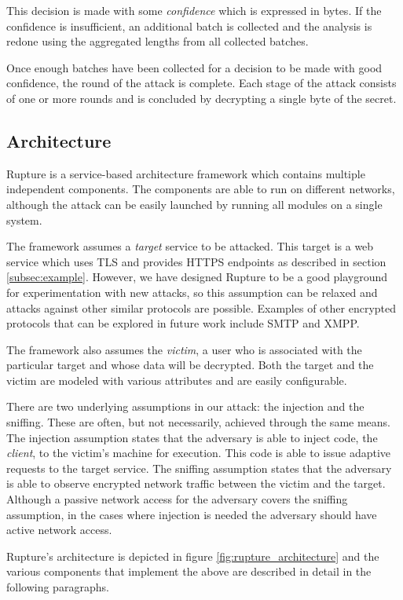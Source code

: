 This decision is made with some \textit{confidence} which is expressed in bytes.
If the confidence is insufficient, an additional batch is collected and the
analysis is redone using the aggregated lengths from all collected batches.

Once enough batches have been collected for a decision to be made with good
confidence, the round of the attack is complete.  Each stage of the attack
consists of one or more rounds and is concluded by decrypting a single byte of the
secret.

\subsection{Architecture}\label{app:rupture}
Rupture is a service-based architecture framework which contains multiple
independent components. The components are able to run on
different networks, although the attack can be easily launched by running all
modules on a single system.

The framework assumes a \textit{target} service to be attacked. This target is a
web service which uses TLS and provides HTTPS endpoints as described in section
\ref{subsec:example}. However, we have designed Rupture to be a good playground
for experimentation with new attacks, so this assumption can be relaxed and
attacks against other similar protocols are possible. Examples of other
encrypted protocols that can be explored in future work include SMTP and XMPP.

The framework also assumes the \textit{victim}, a user who is associated with
the particular target and whose data will be decrypted. Both the target and the
victim are modeled with various attributes and are easily configurable.

There are two underlying assumptions in our attack: the injection and the
sniffing. These are often, but not necessarily, achieved through the same means.
The injection assumption states that the adversary is able to inject code, the
\textit{client}, to the victim's machine for execution. This code is able to
issue adaptive requests to the target service. The sniffing assumption states
that the adversary is able to observe encrypted network traffic between the
victim and the target. Although a passive network access for the adversary
covers the sniffing assumption, in the cases where injection is needed the
adversary should have active network access.

Rupture's architecture is depicted in figure \ref{fig:rupture_architecture} and
the various components that implement the above are described in detail in the
following paragraphs.

